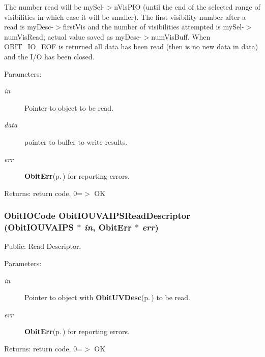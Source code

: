 The number read will be my\-Sel-$>$n\-Vis\-PIO (until the end of the selected range of visibilities in which case it will be smaller). The first visibility number after a read is my\-Desc-$>$first\-Vis and the number of visibilities attempted is my\-Sel-$>$num\-Vis\-Read; actual value saved as my\-Desc-$>$num\-Vis\-Buff. When OBIT\_\-IO\_\-EOF is returned all data has been read (then is no new data in data) and the I/O has been closed. \begin{Desc}
\item[Parameters:]
\begin{description}
\item[{\em in}]Pointer to object to be read. \item[{\em data}]pointer to buffer to write results. \item[{\em err}]{\bf Obit\-Err}{\rm (p.\,\pageref{structObitErr})} for reporting errors. \end{description}
\end{Desc}
\begin{Desc}
\item[Returns:]return code, 0=$>$ OK \end{Desc}
\subsubsection{\setlength{\rightskip}{0pt plus 5cm}Obit\-IOCode Obit\-IOUVAIPSRead\-Descriptor ({\bf Obit\-IOUVAIPS} $\ast$ {\em in}, {\bf Obit\-Err} $\ast$ {\em err})}\label{ObitIOUVAIPS_8h_a21}


Public: Read Descriptor. 

\begin{Desc}
\item[Parameters:]
\begin{description}
\item[{\em in}]Pointer to object with {\bf Obit\-UVDesc}{\rm (p.\,\pageref{structObitUVDesc})} to be read. \item[{\em err}]{\bf Obit\-Err}{\rm (p.\,\pageref{structObitErr})} for reporting errors. \end{description}
\end{Desc}
\begin{Desc}
\item[Returns:]return code, 0=$>$ OK \end{Desc}

